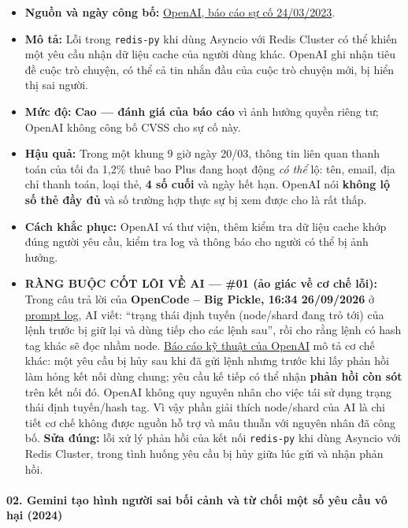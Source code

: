 \begin{itemize}
\tightlist
\item
  \textbf{Nguồn và ngày công bố:} \href{https://openai.com/index/march-20-chatgpt-outage/}{OpenAI, báo cáo sự cố 24/03/2023}.
\item
  \textbf{Mô tả:} Lỗi trong \texttt{redis-py} khi dùng Asyncio với Redis Cluster có thể khiến một yêu cầu nhận dữ liệu cache của người dùng khác. OpenAI ghi nhận tiêu đề cuộc trò chuyện, có thể cả tin nhắn đầu của cuộc trò chuyện mới, bị hiển thị sai người.
\item
  \textbf{Mức độ:} \textbf{Cao --- đánh giá của báo cáo} vì ảnh hưởng quyền riêng tư; OpenAI không công bố CVSS cho sự cố này.
\item
  \textbf{Hậu quả:} Trong một khung 9 giờ ngày 20/03, thông tin liên quan thanh toán của tối đa 1,2\% thuê bao Plus đang hoạt động \emph{có thể} lộ: tên, email, địa chỉ thanh toán, loại thẻ, \textbf{4 số cuối} và ngày hết hạn. OpenAI nói \textbf{không lộ số thẻ đầy đủ} và số trường hợp thực sự bị xem được cho là rất thấp.
\item
  \textbf{Cách khắc phục:} OpenAI vá thư viện, thêm kiểm tra dữ liệu cache khớp đúng người yêu cầu, kiểm tra log và thông báo cho người có thể bị ảnh hưởng.
\item
  \textbf{RÀNG BUỘC CỐT LÕI VỀ AI --- \#01 (ảo giác về cơ chế lỗi):} Trong câu trả lời của \textbf{OpenCode -- Big Pickle, 16:34 26/09/2026} ở \href{Appendix_A_Prompt_Log.md}{prompt log}, AI viết: ``trạng thái định tuyến (node/shard đang trỏ tới) của lệnh trước bị giữ lại và dùng tiếp cho các lệnh sau'', rồi cho rằng lệnh có hash tag khác sẽ đọc nhầm node. \href{https://openai.com/index/march-20-chatgpt-outage/}{Báo cáo kỹ thuật của OpenAI} mô tả cơ chế khác: một yêu cầu bị hủy sau khi đã gửi lệnh nhưng trước khi lấy phản hồi làm hỏng kết nối dùng chung; yêu cầu kế tiếp có thể nhận \textbf{phản hồi còn sót} trên kết nối đó. OpenAI không quy nguyên nhân cho việc tái sử dụng trạng thái định tuyến/hash tag. Vì vậy phần giải thích node/shard của AI là chi tiết cơ chế không được nguồn hỗ trợ và mâu thuẫn với nguyên nhân đã công bố. \textbf{Sửa đúng:} lỗi xử lý phản hồi của kết nối \texttt{redis-py} khi dùng Asyncio với Redis Cluster, trong tình huống yêu cầu bị hủy giữa lúc gửi và nhận phản hồi.
\end{itemize}

\paragraph{02. Gemini tạo hình người sai bối cảnh và từ chối một số yêu cầu vô hại (2024)}\label{gemini-tux1ea1o-huxecnh-ngux1b0ux1eddi-sai-bux1ed1i-cux1ea3nh-vuxe0-tux1eeb-chux1ed1i-mux1ed9t-sux1ed1-yuxeau-cux1ea7u-vuxf4-hux1ea1i-2024}

